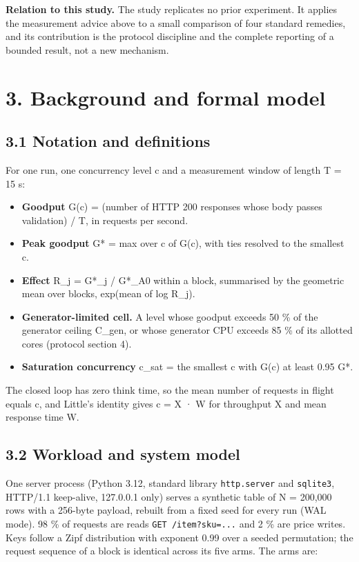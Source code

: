 \documentclass[
]{article}
\providecommand{\tightlist}{%
  \setlength{\itemsep}{0pt}\setlength{\parskip}{0pt}}
\begin{document}
\textbf{Relation to this study.} The study replicates no prior
experiment. It applies the measurement advice above to a small
comparison of four standard remedies, and its contribution is the
protocol discipline and the complete reporting of a bounded result, not
a new mechanism.

\section{3. Background and formal
model}\label{background-and-formal-model}

\subsection{3.1 Notation and
definitions}\label{notation-and-definitions}

For one run, one concurrency level c and a measurement window of length
T = 15 s:

\begin{itemize}
\tightlist
\item
  \textbf{Goodput} G(c) = (number of HTTP 200 responses whose body
  passes validation) / T, in requests per second.
\item
  \textbf{Peak goodput} G* = max over c of G(c), with ties resolved to
  the smallest c.
\item
  \textbf{Effect} R\_j = G*\_j / G*\_A0 within a block, summarised by
  the geometric mean over blocks, exp(mean of log R\_j).
\item
  \textbf{Generator-limited cell.} A level whose goodput exceeds 50 \%
  of the generator ceiling C\_gen, or whose generator CPU exceeds 85 \%
  of its allotted cores (protocol section 4).
\item
  \textbf{Saturation concurrency} c\_sat = the smallest c with G(c) at
  least 0.95 G*.
\end{itemize}

The closed loop has zero think time, so the mean number of requests in
flight equals c, and Little's identity gives c = X · W for throughput X
and mean response time W.

\subsection{3.2 Workload and system
model}\label{workload-and-system-model}

One server process (Python 3.12, standard library \texttt{http.server}
and \texttt{sqlite3}, HTTP/1.1 keep-alive, 127.0.0.1 only) serves a
synthetic table of N = 200,000 rows with a 256-byte payload, rebuilt
from a fixed seed for every run (WAL mode). 98 \% of requests are reads
\texttt{GET\ /item?sku=...} and 2 \% are price writes. Keys follow a
Zipf distribution with exponent 0.99 over a seeded permutation; the
request sequence of a block is identical across its five arms. The arms
are:
\end{document}
